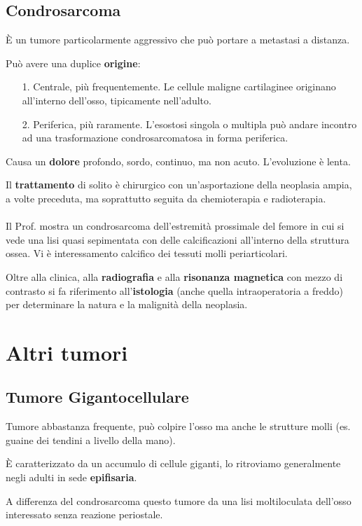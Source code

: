 \subsection{Condrosarcoma}

È un tumore particolarmente aggressivo che può portare a metastasi a distanza.

Può avere una duplice \textbf{origine}:
\begin{itemize}
\item[1.] Centrale, più frequentemente. Le cellule maligne cartilaginee originano all'interno dell'osso, tipicamente nell'adulto.
\item[2.] Periferica, più raramente. L'esostosi singola o multipla può andare incontro ad una trasformazione condrosarcomatosa in forma periferica.
\end{itemize}
Causa un \textbf{dolore} profondo, sordo, continuo, ma non acuto. L'evoluzione è lenta.

Il \textbf{trattamento} di solito è chirurgico con un'asportazione della neoplasia ampia, a volte preceduta, ma soprattutto seguita da chemioterapia e radioterapia.
\\\\
Il Prof. mostra un condrosarcoma dell'estremità prossimale del femore in cui si vede una lisi quasi sepimentata con delle calcificazioni all'interno della struttura ossea. Vi è interessamento calcifico dei tessuti molli periarticolari.

Oltre alla clinica, alla \textbf{radiografia} e alla \textbf{risonanza magnetica} con mezzo di contrasto si fa riferimento all'\textbf{istologia} (anche quella intraoperatoria a freddo) per determinare la natura e la malignità della neoplasia.

\section{Altri tumori}

\subsection{Tumore Gigantocellulare}

Tumore abbastanza frequente, può colpire l'osso ma anche le strutture molli (es. guaine dei tendini a livello della mano).

È caratterizzato da un accumulo di cellule giganti, lo ritroviamo generalmente negli adulti in sede \textbf{epifisaria}.

A differenza del condrosarcoma questo tumore da una lisi moltiloculata dell'osso interessato senza reazione periostale.

